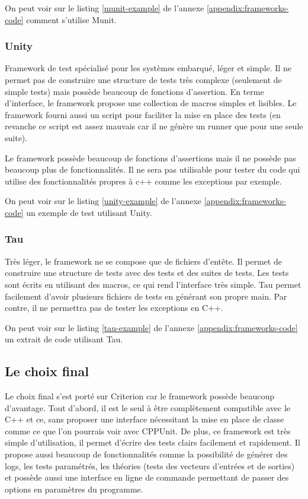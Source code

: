 \documentclass[a4paper]{article}
\begin{document}
On peut voir sur le listing \ref{munit-example} de l'annexe
\ref{appendix:frameworks-code} comment s'utilise Munit.

\subsubsection*{Unity}

Framework de test spécialisé pour les systèmes embarqué, léger et simple. Il ne
permet pas de construire une structure de tests très complexe (seulement de
simple tests) mais possède beaucoup de fonctions d'assertion. En terme
d'interface, le framework propose une collection de macros simples et lisibles.
Le framework fourni aussi un script pour faciliter la mise en place des tests
(en revanche ce script est assez mauvais car il ne génère un runner que pour une
seule suite).

Le framework possède beaucoup de fonctions d'assertions mais il ne possède pas
beaucoup plus de fonctionnalités. Il ne sera pas utilisable pour tester du code
qui utilise des fonctionnalités propres à c++ comme les exceptions par exemple.

On peut voir sur le listing \ref{unity-example} de l'annexe
\ref{appendix:frameworks-code} un exemple de test utilisant Unity.

\subsubsection*{Tau}

Très léger, le framework ne se compose que de fichiers d'entête. Il permet de
construire une structure de tests avec des tests et des suites de tests. Les
tests sont écrits en utilisant des macros, ce qui rend l'interface très simple.
Tau permet facilement d'avoir plusieurs fichiers de tests en générant son propre
main. Par contre, il ne permettra pas de tester les exceptions en C++.

On peut voir sur le listing \ref{tau-example} de l'annexe
\ref{appendix:frameworks-code} un extrait de code utilisant Tau.
\subsection{Le choix final}%

Le choix final s'est porté sur Criterion car le framework possède beaucoup
d'avantage. Tout d'abord, il est le seul à être complètement compatible avec le
C++ et ce, sans proposer une interface nécessitant la mise en place de classe
comme ce que l'on pourrais voir avec CPPUnit. De plus, ce framework est très
simple d'utilisation, il permet d'écrire des tests clairs facilement et
rapidement. Il propose aussi beaucoup de fonctionnalités comme la possibilité de
générer des logs, les tests paramétrés, les théories (tests des vecteurs
d'entrées et de sorties) et possède aussi une interface en ligne de commande
permettant de passer des options en paramètres du programme.
\end{document}
